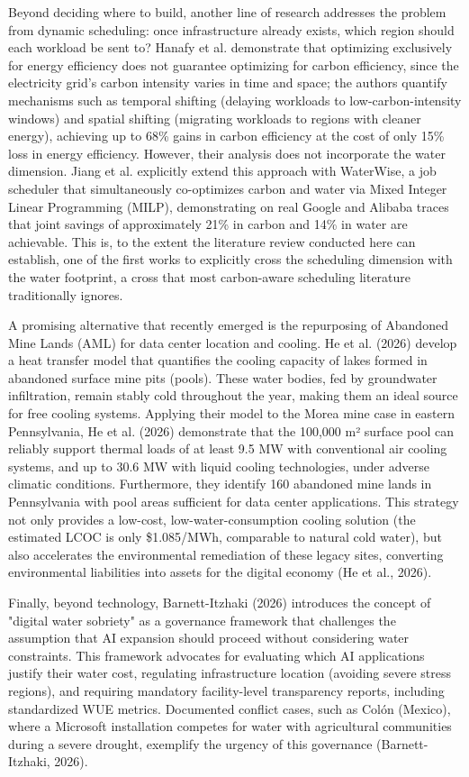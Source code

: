 \documentclass[conference]{IEEEtran}
\begin{document}
Beyond deciding where to build, another line of research addresses the problem from dynamic scheduling: once infrastructure already exists, which region should each workload be sent to? Hanafy et al. \cite{Hanafy2023} demonstrate that optimizing exclusively for energy efficiency does not guarantee optimizing for carbon efficiency, since the electricity grid's carbon intensity varies in time and space; the authors quantify mechanisms such as temporal shifting (delaying workloads to low-carbon-intensity windows) and spatial shifting (migrating workloads to regions with cleaner energy), achieving up to 68\% gains in carbon efficiency at the cost of only 15\% loss in energy efficiency. However, their analysis does not incorporate the water dimension. Jiang et al. \cite{Jiang2025WaterWise} explicitly extend this approach with WaterWise, a job scheduler that simultaneously co-optimizes carbon and water via Mixed Integer Linear Programming (MILP), demonstrating on real Google and Alibaba traces that joint savings of approximately 21\% in carbon and 14\% in water are achievable. This is, to the extent the literature review conducted here can establish, one of the first works to explicitly cross the scheduling dimension with the water footprint, a cross that most carbon-aware scheduling literature traditionally ignores.

A promising alternative that recently emerged is the repurposing of Abandoned Mine Lands (AML) for data center location and cooling. He et al. (2026) develop a heat transfer model that quantifies the cooling capacity of lakes formed in abandoned surface mine pits (pools). These water bodies, fed by groundwater infiltration, remain stably cold throughout the year, making them an ideal source for free cooling systems. Applying their model to the Morea mine case in eastern Pennsylvania, He et al. (2026) demonstrate that the 100,000 m² surface pool can reliably support thermal loads of at least 9.5 MW with conventional air cooling systems, and up to 30.6 MW with liquid cooling technologies, under adverse climatic conditions. Furthermore, they identify 160 abandoned mine lands in Pennsylvania with pool areas sufficient for data center applications. This strategy not only provides a low-cost, low-water-consumption cooling solution (the estimated LCOC is only \$1.085/MWh, comparable to natural cold water), but also accelerates the environmental remediation of these legacy sites, converting environmental liabilities into assets for the digital economy (He et al., 2026).

Finally, beyond technology, Barnett-Itzhaki (2026) introduces the concept of "digital water sobriety" as a governance framework that challenges the assumption that AI expansion should proceed without considering water constraints. This framework advocates for evaluating which AI applications justify their water cost, regulating infrastructure location (avoiding severe stress regions), and requiring mandatory facility-level transparency reports, including standardized WUE metrics. Documented conflict cases, such as Colón (Mexico), where a Microsoft installation competes for water with agricultural communities during a severe drought, exemplify the urgency of this governance (Barnett-Itzhaki, 2026).
\end{document}
